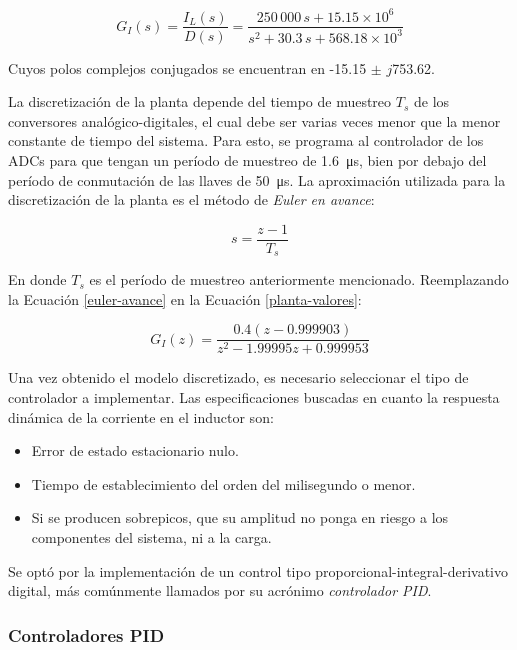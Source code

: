 \begin{equation}
  \boxed{G_I(s) = \frac{I_L(s)}{D(s)} = \frac{250\,000\,s + 15.15 \times 10^6}{s^2 + 30.3 \, s + 568.18 \times 10^3}}
  \label{planta-valores}
\end{equation}

Cuyos polos complejos conjugados se encuentran en -15.15 $\pm$ $j$753.62. 

La discretización de la planta depende del tiempo de muestreo $T_s$ de los conversores analógico-digitales, el cual debe ser varias veces menor que la menor constante de tiempo del sistema. Para esto, se programa al controlador de los ADCs para que tengan un período de muestreo de \SI{1.6}{\micro\second}, bien por debajo del período de conmutación de las llaves de \SI{50}{\micro\second}. La aproximación utilizada para la discretización de la planta es el método de \emph{Euler en avance}:

\begin{equation}
  s = \frac{z-1}{T_s}
  \label{euler-avance}
\end{equation}

En donde $T_s$ es el período de muestreo anteriormente mencionado. Reemplazando la Ecuación \ref{euler-avance} en la Ecuación \ref{planta-valores}:

\begin{equation}
  \boxed{G_I(z) = \frac{0.4(z-0.999903)}{z^2 - 1.99995z  + 0.999953}}
  \label{modelo-discretizado}
\end{equation}

Una vez obtenido el modelo discretizado, es necesario seleccionar el tipo de controlador a implementar. Las especificaciones buscadas en cuanto la respuesta dinámica de la corriente en el inductor son:

\begin{itemize}
  \item Error de estado estacionario nulo.
  \item Tiempo de establecimiento del orden del milisegundo o menor.
  \item Si se producen sobrepicos, que su amplitud no ponga en riesgo a los componentes del sistema, ni a la carga.
\end{itemize}

Se optó por la implementación de un control tipo proporcional-integral-derivativo digital, más comúnmente llamados por su acrónimo \emph{controlador PID}.

\subsubsection{Controladores PID}
\label{diseno-controladores-pid}

